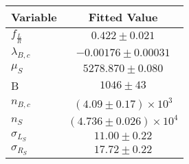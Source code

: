 \begin{tabular}[t]{lc}
\hline
Variable &Fitted Value\\
\hline\hline
$f_{\frac{L}{R}}$&$0.422\pm0.021$\\
\hline
$\lambda_{B,c}$&$-0.00176\pm0.00031$\\
\hline
$\mu_S$&$5278.870\pm0.080$\\
\hline
B&$1046\pm43$\\
\hline
$n_{B,c}$&$(4.09\pm0.17)\times 10^3$\\
\hline
$n_S$&$(4.736\pm0.026)\times 10^4$\\
\hline
$\sigma_{L_S}$&$11.00\pm0.22$\\
\hline
$\sigma_{R_S}$&$17.72\pm0.22$\\
\hline
\end{tabular}